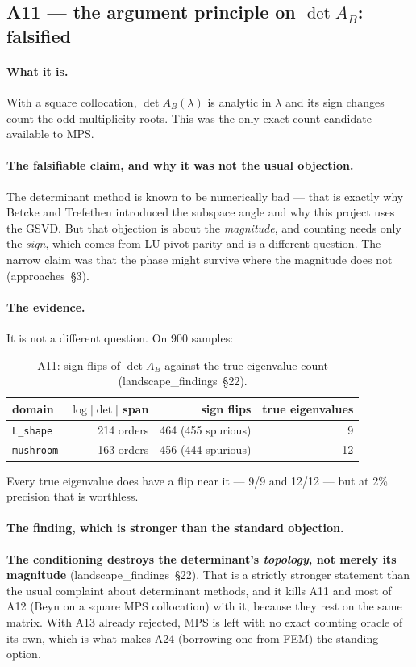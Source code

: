 \documentclass[11pt]{article}
\newcommand{\file}[1]{\texttt{#1}}
\newcommand{\lf}[1]{(landscape\_findings~\S#1)}
\newcommand{\ap}[1]{(approaches~\S#1)}
\newcommand{\lam}{\lambda}
\begin{document}
\subsection{\texorpdfstring{A11 --- the argument principle on $\det A_B$: falsified}{A11 -- the argument principle on det A\_B: falsified}}

\paragraph{What it is.} With a square collocation, $\det A_B(\lam)$ is analytic in $\lam$ and its
sign changes count the odd-multiplicity roots. This was the only exact-count candidate available
to MPS.

\paragraph{The falsifiable claim, and why it was not the usual objection.} The determinant method
is known to be numerically bad --- that is exactly why Betcke and Trefethen introduced the
subspace angle and why this project uses the GSVD. But that objection is about the
\emph{magnitude}, and counting needs only the \emph{sign}, which comes from LU pivot parity and is
a different question. The narrow claim was that the phase might survive where the magnitude does
not \ap{3}.

\paragraph{The evidence.} It is not a different question. On 900 samples:

\begin{table}[htbp]
\centering
\caption{A11: sign flips of $\det A_B$ against the true eigenvalue count \lf{22}.}
\begin{tabular}{lrrr}
\toprule
domain & $\log|\det|$ span & sign flips & true eigenvalues \\
\midrule
\file{L\_shape} & 214 orders & 464 (455 spurious) & 9 \\
\file{mushroom} & 163 orders & 456 (444 spurious) & 12 \\
\bottomrule
\end{tabular}
\end{table}

Every true eigenvalue does have a flip near it --- 9/9 and 12/12 --- but at 2\% precision that is
worthless.

\paragraph{The finding, which is stronger than the standard objection.}
\textbf{The conditioning destroys the determinant's \emph{topology}, not merely its magnitude}
\lf{22}. That is a strictly stronger statement than the usual complaint about determinant methods,
and it kills A11 and most of A12 (Beyn on a square MPS collocation) with it, because they rest on
the same matrix. With A13 already rejected, MPS is left with no exact counting oracle of its own,
which is what makes A24 (borrowing one from FEM) the standing option.
\end{document}
